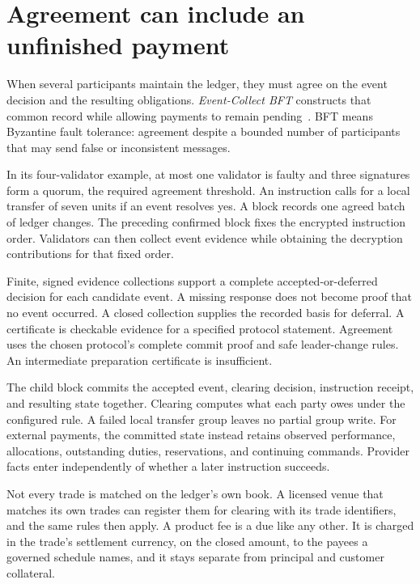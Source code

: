 \documentclass{momentum}
\begin{document}
\section{Agreement can include an unfinished payment}
\label{sec:agreement}

When several participants maintain the ledger, they must agree on the event decision and the resulting obligations. \emph{Event-Collect BFT} constructs that common record while allowing payments to remain pending~\cite{event}. BFT means Byzantine fault tolerance: agreement despite a bounded number of participants that may send false or inconsistent messages.

In its four-validator example, at most one validator is faulty and three signatures form a quorum, the required agreement threshold. An instruction calls for a local transfer of seven units if an event resolves yes. A block records one agreed batch of ledger changes. The preceding confirmed block fixes the encrypted instruction order. Validators can then collect event evidence while obtaining the decryption contributions for that fixed order.

Finite, signed evidence collections support a complete accepted-or-deferred decision for each candidate event. A missing response does not become proof that no event occurred. A closed collection supplies the recorded basis for deferral. A certificate is checkable evidence for a specified protocol statement. Agreement uses the chosen protocol's complete commit proof and safe leader-change rules. An intermediate preparation certificate is insufficient.

The child block commits the accepted event, clearing decision, instruction receipt, and resulting state together. Clearing computes what each party owes under the configured rule. A failed local transfer group leaves no partial group write. For external payments, the committed state instead retains observed performance, allocations, outstanding duties, reservations, and continuing commands. Provider facts enter independently of whether a later instruction succeeds.

Not every trade is matched on the ledger's own book. A licensed venue that matches its own trades can register them for clearing with its trade identifiers, and the same rules then apply. A product fee is a due like any other. It is charged in the trade's settlement currency, on the closed amount, to the payees a governed schedule names, and it stays separate from principal and customer collateral.
\end{document}
